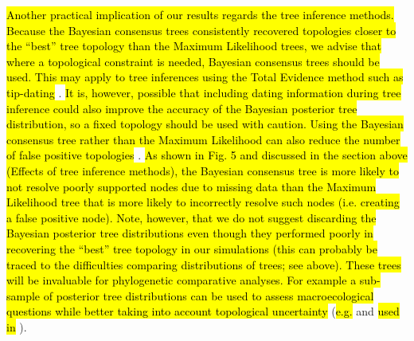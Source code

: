 \documentclass[12pt,letterpaper]{article}
\begin{document}
\hl{Another practical implication of our results regards the tree inference methods.
Because the Bayesian consensus trees consistently recovered topologies closer to the ``best'' tree topology than the Maximum Likelihood trees, we advise that where a topological constraint is needed, Bayesian consensus trees should be used.
This may apply to tree inferences using the Total Evidence method such as tip-dating }\citep[\hl{e.g.}][]{ronquista2012,Wood01032013,BEASTmaster}.
\hl{It is, however, possible that including dating information during tree inference could also improve the accuracy of the Bayesian posterior tree distribution, so a fixed topology should be used with caution.
Using the Bayesian consensus tree rather than the Maximum Likelihood can also reduce the number of false positive topologies }\citep[\hl{\textit{sensu}}][]{Swofford2001}.
\hl{As shown in Fig. 5 and discussed in the section above (Effects of tree inference methods), the Bayesian consensus tree is more likely to not resolve poorly supported nodes due to missing data than the Maximum Likelihood tree that is more likely to incorrectly resolve such nodes (i.e. creating a false positive node).
Note, however, that we do not suggest discarding the Bayesian posterior tree distributions even though they performed poorly in recovering the ``best'' tree topology in our simulations (this can probably be traced to the difficulties comparing distributions of trees; see above).
These trees will be invaluable for phylogenetic comparative analyses.
For example a sub-sample of posterior tree distributions can be used to assess macroecological questions while better taking into account topological uncertainty }(\hl{e.g. }\citealt{fritzdiversity2013} and \citealt{jetzthe2012}\hl{ used in }\citealt{healy2014}).
\end{document}
